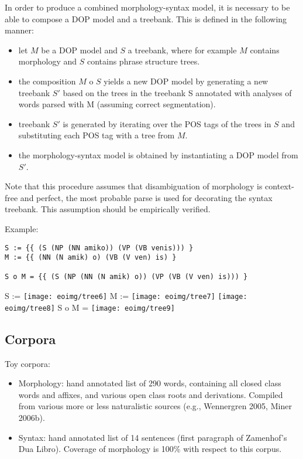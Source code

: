 \documentclass[10pt,a4paper]{article}
\begin{document}
In order to produce a combined morphology-syntax model, it is necessary to be
able to compose a DOP model and a treebank. This is defined in the following
manner:

\begin{itemize}
\item let $M$ be a DOP model and $S$ a treebank, where for example $M$ contains
      morphology and $S$ contains phrase structure trees.
\item the composition $M$ o $S$ yields a new DOP model by generating a new
      treebank $S'$ based on the trees in the treebank S annotated with
      analyses of words parsed with M (assuming correct segmentation).
\item treebank $S'$ is generated by iterating over the POS tags of the trees in
      $S$ and substituting each POS tag with a tree from $M$.
\item the morphology-syntax model is obtained by instantiating a DOP model from
      $S'$.
\end{itemize}

Note that this procedure assumes that disambiguation of morphology is
context-free and perfect, the most probable parse is used for decorating the
syntax treebank.  This assumption should be empirically verified. 

Example:

\begin{verbatim}
S := {{ (S (NP (NN amiko)) (VP (VB venis))) }
M := {{ (NN (N amik) o) (VB (V ven) is) }

S o M = {{ (S (NP (NN (N amik) o)) (VP (VB (V ven) is))) }
\end{verbatim}

S := %
\texttt{[image: eoimg/tree6]}
M := %
\texttt{[image: eoimg/tree7]}
\texttt{[image: eoimg/tree8]}
S o M = %
\texttt{[image: eoimg/tree9]}

\subsection{Corpora}

Toy corpora:

\begin{itemize}
\item Morphology: hand annotated list of 290 words, containing all closed class
      words and affixes, and various open class roots and derivations. Compiled
      from various more or less naturalistic sources (e.g., Wennergren 2005,
      Miner 2006b).
\item Syntax: hand annotated list of 14 sentences (first paragraph of
      Zamenhof's Dua Libro). Coverage of morphology is 100\% with respect to
      this corpus.
\end{itemize}
\end{document}
